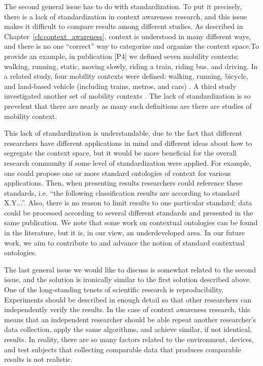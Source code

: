 The second general issue has to do with standardization. To put it precisely, there is a lack of standardization in context awareness research, and this issue makes it difficult to compare results among different studies. As described in Chapter~\ref{ch:context_awareness}, context is understood in many different ways, and there is no one ``correct'' way to categorize and organize the context space.To provide an example, in publication [P4] we defined seven mobility contexts: walking, running, static, moving slowly, riding a train, riding bus, and driving. In a related study, four mobility contexts were defined: walking, running, bicycle, and land-based vehicle (including trains, metros, and cars) \cite{elhoushi2014robust}. A third study investigated another set of mobility contexts \cite{stenneth2013detecting}. The lack of standardization is so prevelent that there are nearly as many such definitions are there are studies of mobility context.

This lack of standardization is understandable, due to the fact that different researchers have different applications in mind and different ideas about how to segregate the context space, but it would be more beneficial for the overall research community if some level of standardization were applied. For example, one could propose one or more standard ontologies of context for various applications. Then, when presenting results researchers could reference these standards, i.e. ``the following classification results are according to standard X.Y...''. Also, there is no reason to limit results to one particular standard; data could be processed according to several different standards and presented in the same publication. We note that some work on contextual ontologies can be found in the literature, %
 but it is, in our view, an underdeveloped area. In our future work, we aim to contribute to and advance the notion of standard contextual ontologies.

The last general issue we would like to discuss is somewhat related to the second issue, and the solution is ironically similar to the first solution described above. One of the long-standing tenets of scientific research is reproducibility. Experiments should be described in enough detail so that other researchers can independently verify the results. In the case of context awareness research, this means that an independent researcher should be able repeat another researcher's data collection, apply the same algorithms, and achieve similar, if not identical, results. In reality, there are so many factors related to the environment, devices, and test subjects that collecting comparable data that produces comparable results is not realistic.

